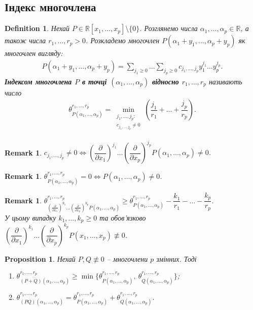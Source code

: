 \documentclass[a4paper, 10pt]{article}
\theoremstyle{theoremdd}
\theoremstyle{theoremdd}
\newtheorem{definition}[theorem]{Definition}
\theoremstyle{theoremdd}
\theoremstyle{theoremdd}
\theoremstyle{theoremdd}
\theoremstyle{theoremdd}
\theoremstyle{theoremdd}
\theoremstyle{theoremdd}
\theoremstyle{theoremdd}
\newtheorem{proposition}[theorem]{Proposition}
\theoremstyle{theoremdd}
\theoremstyle{theoremdd}
\newtheorem{remark}[theorem]{Remark}
\theoremstyle{theoremdd}
\theoremstyle{theoremdd}
\theoremstyle{theoremdd}
\theoremstyle{theoremdd}
\begin{document}
\subsection{Індекс многочлена}
\begin{definition}
Нехай $P \in \mathbb{R}[x_1,\dots,x_p] \setminus \{0\}$. Розглянемо числа $\alpha_1,\dots,\alpha_p \in \mathbb{R}$, а також числа $r_1,\dots,r_p > 0$.  Розкладемо многочлен $P(\alpha_1+y_1,\dots,\alpha_p+y_p)$ як многочлен вигляду:
\begin{align*}
P(\alpha_1+y_1,\dots,\alpha_p+y_p) = \sum_{j_1 \geq 0} \dots \sum_{j_p \geq 0} c_{j_1,\dots,j_p} y_1^{j_1} \dots y_p^{j_p}.
\end{align*}
\textbf{Індексом многочлена $P$ в точці $(\alpha_1,\dots,\alpha_p)$ відносно $r_1,\dots,r_p$} називають число
\begin{align*}
\theta_{P(\alpha_1,\dots,\alpha_p)}^{r_1,\dots,r_p} = \min_{\substack{j_1,\dots,j_p: \\ c_{j_1,\dots,j_p} \neq 0}} \left( \dfrac{j_1}{r_1} + \dots + \dfrac{j_p}{r_p} \right).
\end{align*}
\end{definition}

\begin{remark}
$c_{j_1,\dots,j_p} \neq 0 \iff \left( \dfrac{\partial}{\partial x_1}\right)^{j_1} \dots \left( \dfrac{\partial}{\partial x_p} \right)^{j_p} P(\alpha_1,\dots,\alpha_p) \neq 0$.
\end{remark}

\begin{remark}
$\theta_{P(\alpha_1,\dots,\alpha_p)}^{r_1,\dots,r_p} = 0 \iff P(\alpha_1,\dots,\alpha_p) \neq 0$.
\end{remark}

\begin{remark}
$\theta_{\left(\frac{\partial}{\partial x_1}\right)^{k_1} \dots \left(\frac{\partial}{\partial x_p}\right)^{k_p} P(\alpha_1,\dots,\alpha_p)}^{r_1,\dots,r_p} \geq \theta_{P(\alpha_1,\dots,\alpha_p)}^{r_1,\dots,r_p} - \dfrac{k_1}{r_1} - \dots - \dfrac{k_p}{r_p}$.\\
У цьому випадку $k_1,\dots,k_p \geq 0$ та обов'язково $\left(\dfrac{\partial}{\partial x_1}\right)^{k_1} \dots \left(\dfrac{\partial}{\partial x_p}\right)^{k_p} P(x_1,\dots,x_p) \not\equiv 0$.
\end{remark}

\begin{proposition}
Нехай $P,Q \not\equiv 0$ -- многочлени $p$ змінних. Тоді
\begin{enumerate}[wide=0pt,label={\arabic*)}]
\item $\theta_{(P+Q)(\alpha_1,\dots,\alpha_p)}^{r_1,\dots,r_p} \geq \min \{ \theta_{P(\alpha_1,\dots,\alpha_p)}^{r_1,\dots,r_p},\ \theta_{Q(\alpha_1,\dots,\alpha_p)}^{r_1,\dots,r_p}\}$;
\item $\theta_{(PQ)(\alpha_1,\dots,\alpha_p)}^{r_1,\dots,r_p} = \theta_{P(\alpha_1,\dots,\alpha_p)}^{r_1,\dots,r_p} + \theta_{Q(\alpha_1,\dots,\alpha_p)}^{r_1,\dots,r_p}$.
\end{enumerate}
\end{proposition}
\end{document}
